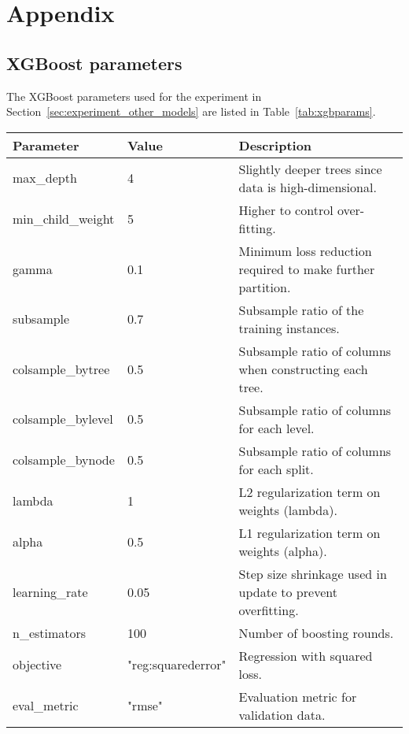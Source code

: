 \appendix
\onecolumn
\section{Appendix}\label{sec:appendix}
\subsection{XGBoost parameters}\label{sec:XGBoost_parameters}
The XGBoost parameters used for the experiment in Section~\ref{sec:experiment_other_models} are listed in Table~\ref{tab:xgbparams}.

\begin{table*}[ht]
\centering
\caption{XGBoost Parameter Configuration}
\label{tab:xgbparams}
\begin{tabular}{llp{10cm}}
\toprule
\textbf{Parameter} & \textbf{Value} & \textbf{Description} \\
\midrule
max\_depth & 4 & Slightly deeper trees since data is high-dimensional. \\
min\_child\_weight & 5 & Higher to control over-fitting. \\
gamma & 0.1 & Minimum loss reduction required to make further partition. \\
subsample & 0.7 & Subsample ratio of the training instances. \\
colsample\_bytree & 0.5 & Subsample ratio of columns when constructing each tree. \\
colsample\_bylevel & 0.5 & Subsample ratio of columns for each level. \\
colsample\_bynode & 0.5 & Subsample ratio of columns for each split. \\
lambda & 1 & L2 regularization term on weights (lambda). \\
alpha & 0.5 & L1 regularization term on weights (alpha). \\
learning\_rate & 0.05 & Step size shrinkage used in update to prevent overfitting. \\
n\_estimators & 100 & Number of boosting rounds. \\
objective & "reg:squarederror" & Regression with squared loss. \\
eval\_metric & "rmse" & Evaluation metric for validation data. \\
\bottomrule
\end{tabular}
\end{table*}